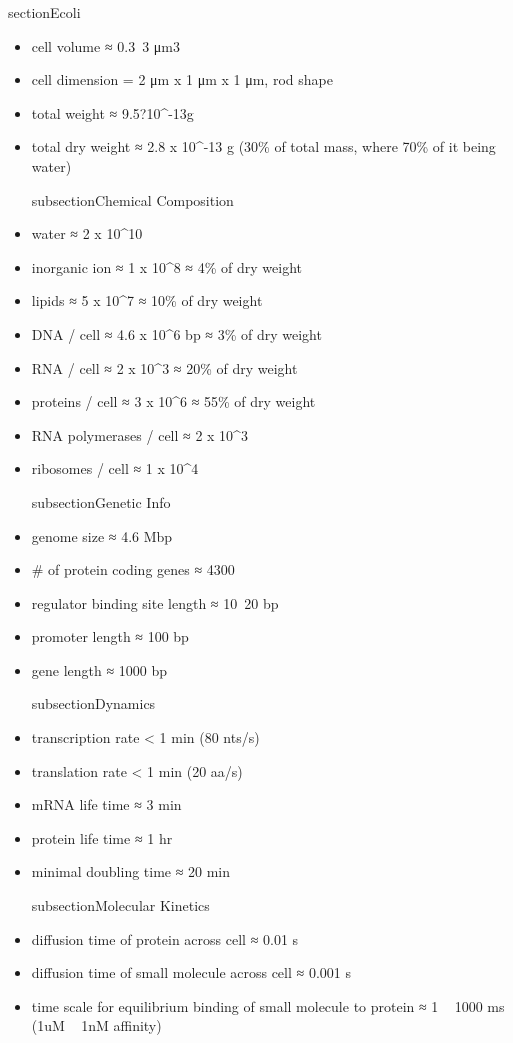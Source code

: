 \documentclass{article}
\begin{document}
    section{Ecoli}
    \begin{itemize}
        subsection{Physical Specification}
        \gdef\Volume{#1*10^{-18}}
        \item cell volume ≈ 0.3~3 μm3    
        \item cell dimension = 2 μm x 1 μm x 1 μm, rod shape
        \item total weight ≈ 9.5?10^-13g %
        \item total dry weight ≈ 2.8 x 10^{-13} g (30\% of total mass, where 70\% of it being water) %
        
        subsection{Chemical Composition}
        \item water ≈ 2 x 10^{10}
        \item inorganic ion ≈ 1 x 10^{8} ≈ 4\% of dry weight %
        \item lipids ≈ 5 x 10^{7} ≈ 10\% of dry weight %
        \item DNA / cell ≈ 4.6 x 10^{6} bp ≈ 3\% of dry weight %
        \item RNA / cell ≈ 2 x 10^{3} ≈ 20\% of dry weight %
        \item proteins / cell ≈ 3 x 10^{6} ≈ 55\% of dry weight %
        
        \item RNA polymerases / cell ≈ 2 x 10^{3} %
        \item ribosomes / cell ≈ 1 x 10^{4}

        subsection{Genetic Info}
        \item genome size ≈ 4.6 Mbp
        \item # of protein coding genes ≈ 4300
        \item regulator binding site length ≈ 10~20 bp
        \item promoter length ≈ 100 bp
        \item gene length ≈ 1000 bp

        subsection{Dynamics}
        \item transcription rate < 1 min (80 nts/s)
        \item translation rate < 1 min (20 aa/s)
        \item mRNA life time ≈ 3 min
        \item protein life time ≈ 1 hr
        \item minimal doubling time ≈ 20 min

        subsection{Molecular Kinetics}
        \item diffusion time of protein across cell ≈ 0.01 s
        \item diffusion time of small molecule across cell ≈ 0.001 s
        \item time scale for equilibrium binding of small molecule to protein ≈ 1 ~ 1000 ms (1uM ~ 1nM affinity)

    \end{itemize}    
\end{document}
